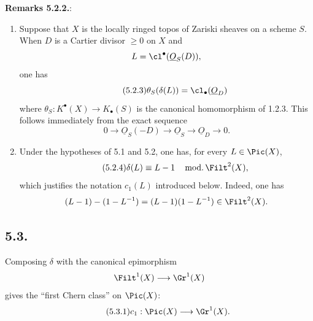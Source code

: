 \textbf{Remarks 5.2.2.}:
\begin{enumerate}[label=\alph*)]
\item Suppose that \(X\) is the locally ringed topos of Zariski sheaves on a scheme \(S\). When \(D\) is a Cartier divisor \(\geq0\) on \(X\) and
\[
 L=\cl^{\bullet}(\underline{O}_S(D)),
\]
one has
\begin{equation}\tag{5.2.3}
 \theta_S(\delta(L))=\cl_\bullet(\underline{O}_D)
\end{equation}
where \(\theta_S:K^{\bullet}(X)\to K_\bullet(S)\) is the canonical homomorphism of 1.2.3. This follows immediately from the exact sequence
\[
0\longrightarrow\underline{O}_S(-D)\longrightarrow\underline{O}_S\longrightarrow\underline{O}_D\longrightarrow0.
\]

\item Under the hypotheses of 5.1 and 5.2, one has, for every \(L\in\Pic(X)\),
\begin{equation}\tag{5.2.4}
 \delta(L)\equiv L-1\quad\operatorname{mod.}\Filt^2(X),
\end{equation}
which justifies the notation \(c_1(L)\) introduced below. Indeed, one has
\[
 (L-1)-(1-L^{-1})=(L-1)(1-L^{-1})\in\Filt^2(X).
\]
\end{enumerate}

\subsection*{5.3.}
Composing \(\delta\) with the canonical epimorphism
\[
 \Filt^1(X)\longrightarrow\Gr^1(X)
\]
gives the ``first Chern class'' on \(\Pic(X)\):
\begin{equation}\tag{5.3.1}
 c_1:\Pic(X)\longrightarrow\Gr^1(X).
\end{equation}

